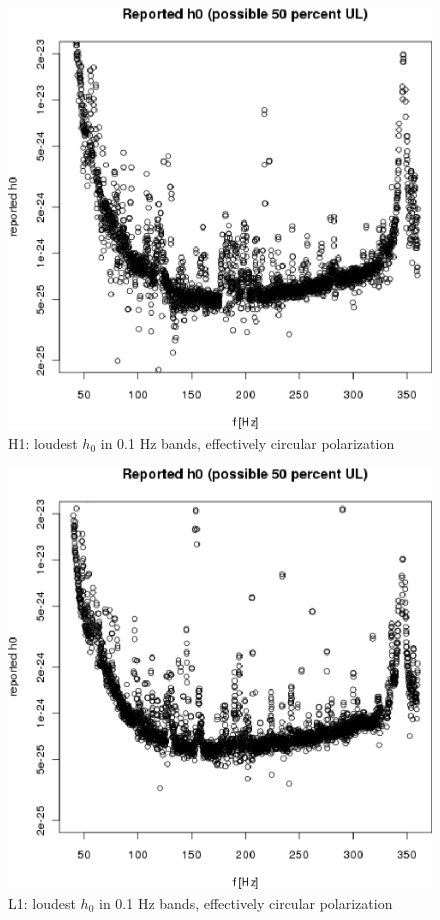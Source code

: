 \begin{figure}
\begin{center}
\includegraphics[width=0.4\paperwidth,height=0.2\paperheight]{plots/h0FullUL50log-H1.eps}
\caption{
H1: loudest $h_0$ in 0.1 Hz bands, effectively circular polarization}
\end{center}
\end{figure}

\begin{figure}
\begin{center}
\includegraphics[width=0.4\paperwidth,height=0.2\paperheight]{plots/h0FullUL50log-L1.eps}
\caption{
L1: loudest $h_0$ in 0.1 Hz bands, effectively circular polarization}
\end{center}
\end{figure}

